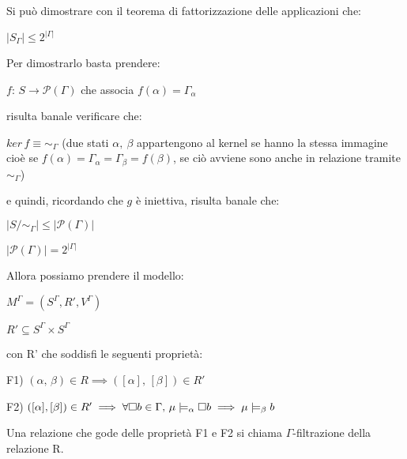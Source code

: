 Si può dimostrare con il teorema di fattorizzazione delle applicazioni
che:

$|S_{\Gamma}|\leq2^{|\Gamma|}$

\begin{center}  \end{center}

Per dimostrarlo basta prendere:

$f:\, S\rightarrow\mathcal{P}(\Gamma)$ che associa $f(\alpha)=\Gamma_{\alpha}$

risulta banale verificare che:

$ker\, f\equiv\sim_{\Gamma}$ (due stati $\alpha,\ \beta$ appartengono
al kernel se hanno la stessa immagine cioè se $f(\alpha)=\Gamma_{\alpha}=\Gamma_{\beta}=f(\beta)$,
se ciò avviene sono anche in relazione tramite $\sim_{\Gamma}$)

e quindi, ricordando che $g$ è iniettiva, risulta banale che:

$|S/\sim_{\Gamma}|\leq|\mathcal{P}(\Gamma)|$

$|\mathcal{P}(\Gamma)|=2^{|\Gamma|}$		

Allora possiamo prendere il modello:

$M^{\Gamma}=(S^{\Gamma},R',V^{\Gamma})$

$R'\subseteq S^{\Gamma}\times S^{\Gamma}$

con R' che soddisfi le seguenti proprietà:

F1) $(\alpha,\,\beta)\in R\implies([\alpha],\,[\beta])\in R'$

F2) $([\alpha],[\beta])\in R'\implies\forall\square b\in\Gamma,\,\mu\models_{\alpha}\square b\implies\mu\models_{\beta}b$

Una relazione che gode delle proprietà F1 e F2 si chiama $\Gamma$-filtrazione
della relazione R.

